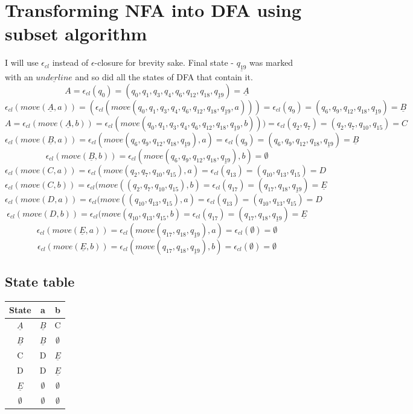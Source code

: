 \section{Transforming NFA into DFA using subset algorithm}
I will use $\epsilon_{cl}$ instead of $\epsilon$-closure for brevity sake.
Final state - $\underline{q_{19}}$ was marked with an $\underline{underline}$ and so did all the states of DFA that contain it.
\[ A = \epsilon_{cl}(q_0) = (q_0, q_1, q_3, q_4, q_6, q_{12}, q_{18}, \underline{q_{19}}) = \underline{A} \]
\[ \epsilon_{cl}(move(\underline{A}, a)) = (\epsilon_{cl}(move(q_0, q_1, q_3, q_4, q_6, q_{12}, q_{18}, \underline{q_{19}}, a))) = \epsilon_{cl}(q_9) = (q_6, q_9, q_{12}, q_{18}, \underline{q_{19}}) = \underline{B}  \]
\[ A = \epsilon_{cl}(move(\underline{A}, b)) = \epsilon_{cl}(move(q_0, q_1, q_3, q_4, q_6, q_{12}, q_{18}, \underline{q_{19}}, b))) = \epsilon_{cl}(q_2, q_7) = (q_2, q_7, q_{10}, q_{15}) = C \]
\[ \epsilon_{cl}(move(\underline{B}, a)) = \epsilon_{cl}(move(q_6, q_9, q_{12}, q_{18}, \underline{q_{19}}), a) = \epsilon_{cl}(q_9) = (q_6, q_9, q_{12}, q_{18}, \underline{q_{19}}) = \underline{B} \]
\[ \epsilon_{cl}(move(\underline{B}, b)) = \epsilon_{cl}(move(q_6, q_9, q_{12}, q_{18}, \underline{q_{19}}), b) = \emptyset \]
\[ \epsilon_{cl}(move(C, a)) = \epsilon_{cl}(move(q_2, q_7, q_{10}, q_{15}), a) = \epsilon_{cl}(q_{13}) = (q_{10}, q_{13}, q_{15}) = D \]
\[ \epsilon_{cl}(move(C, b)) = \epsilon_{cl}(move((q_2, q_7, q_{10}, q_{15}), b) = \epsilon_{cl}(q_{17}) = (q_{17}, q_{18}, \underline{q_{19}}) = \underline{E}  \]
\[ \epsilon_{cl}(move(D, a)) = \epsilon_{cl}(move((q_{10}, q_{13}, q_{15}), a) = \epsilon_{cl}(q_{13}) = (q_{10}, q_{13}, q_{15}) = D  \]
\[ \epsilon_{cl}(move(D, b)) = \epsilon_{cl}(move(q_{10}, q_{13}, q_{15}, b) = \epsilon_{cl}(q_{17}) = (q_{17}, q_{18}, \underline{q_{19}}) = \underline{E} \]
\[ \epsilon_{cl}(move(\underline{E}, a)) = \epsilon_{cl}(move(q_{17}, q_{18}, \underline{q_{19}}), a) = \epsilon_{cl}(\emptyset) = \emptyset \]
\[ \epsilon_{cl}(move(\underline{E}, b)) = \epsilon_{cl}(move(q_{17}, q_{18}, \underline{q_{19}}), b) = \epsilon_{cl}(\emptyset) = \emptyset \]

\subsection{State table}
\begin{center}
\begin{tabular}{||c c c||}
 \hline
 State & a & b \\
 \hline
$\underline{A}$ & $\underline{B}$ & C\\
 \hline
 $\underline{B}$ & $\underline{B}$  & $\emptyset$ \\
 \hline
 C & D & $\underline{E}$\\
 \hline
 D & D & $\underline{E}$\\
 \hline
 $\underline{E}$ & $\emptyset$ & $\emptyset$\\
 \hline
$\emptyset$ & $\emptyset$ & $\emptyset$\\
 \hline
\end{tabular}
\end{center}

